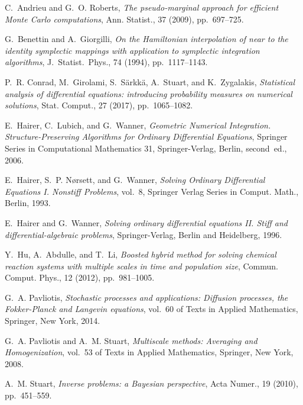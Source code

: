 \documentclass[10pt]{article}
\begin{document}
%
%
\def\cprime{$'$}
\begin{thebibliography}{10}
	
	{\sc C.~Andrieu and G.~O. Roberts}, {\em The pseudo-marginal approach for
		efficient {M}onte {C}arlo computations}, Ann. Statist., 37 (2009),
	pp.~697--725.
	
	{\sc G.~Benettin and A.~Giorgilli}, {\em On the {H}amiltonian interpolation of
		near to the identity symplectic mappings with application to symplectic
		integration algorithms}, J.\ Statist.\ Phys., 74 (1994), pp.~1117--1143.
	
	{\sc P.~R. Conrad, M.~Girolami, S.~S\"{a}rkk\"{a}, A.~Stuart, and
		K.~Zygalakis}, {\em Statistical analysis of differential equations:
		introducing probability measures on numerical solutions}, Stat. Comput., 27
	(2017), pp.~1065--1082.
	
	{\sc E.~Hairer, C.~Lubich, and G.~Wanner}, {\em Geometric Numerical
		Integration. Structure-Preserving Algorithms for Ordinary Differential
		Equations}, Springer Series in Computational Mathematics 31, Springer-Verlag,
	Berlin, second~ed., 2006.
	
	{\sc E.~Hairer, S.~P. N{\o{}}rsett, and G.~Wanner}, {\em Solving Ordinary
		Differential Equations I. Nonstiff Problems}, vol.~8, Springer Verlag Series
	in Comput. Math., Berlin, 1993.
	
	{\sc E.~Hairer and G.~Wanner}, {\em Solving ordinary differential equations II.
		Stiff and differential-algebraic problems}, Springer-Verlag, Berlin and
	Heidelberg, 1996.
	
	{\sc Y.~Hu, A.~Abdulle, and T.~Li}, {\em Boosted hybrid method for solving
		chemical reaction systems with multiple scales in time and population size},
	Commun. Comput. Phys., 12 (2012), pp.~981--1005.
	
	{\sc G.~A. Pavliotis}, {\em Stochastic processes and applications: Diffusion
		processes, the Fokker-Planck and Langevin equations}, vol.~60 of Texts in
	Applied Mathematics, Springer, New York, 2014.
	
	{\sc G.~A. Pavliotis and A.~M. Stuart}, {\em Multiscale methods: Averaging and
		Homogenization}, vol.~53 of Texts in Applied Mathematics, Springer, New York,
	2008.
	
	{\sc A.~M. Stuart}, {\em Inverse problems: a {B}ayesian perspective}, Acta
	Numer., 19 (2010), pp.~451--559.
	
\end{thebibliography}
\end{document}
